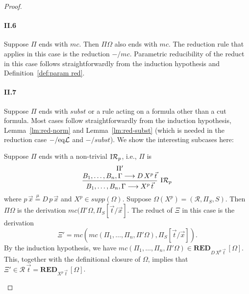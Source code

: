 \documentclass[preprint]{elsarticle}
\def\Rscr{{\mathcal R}}
\newcommand{\Seq}[2]{#1\longrightarrow #2}
\newcommand{\defmu}{\stackrel{\mu}{=}}
\newcommand{\eqL}{{\rm eq}{\cal L}}
\newcommand{\indRP}{{\rm I}{\cal R}_p}
\def\RED{{\mathbf{RED}}}
\begin{document}
\begin{proof}
\paragraph{\bf II.6} Suppose $\Pi$ ends with $mc$.  Then $\Pi\Omega$
also ends with $mc$. The reduction rule that applies in this case is
the reduction $-/mc$.  Parametric reducibility of the reduct in this
case follows straightforwardly from the induction hypothesis and
Definition~\ref{def:param red}.

\paragraph{\bf II.7} Suppose $\Pi$ ends with $subst$ or a rule acting on a
formula other than a cut formula.
Most cases follow straightforwardly from the induction hypothesis,
Lemma~\ref{lm:red-norm} and Lemma~\ref{lm:red-subst} (which is needed
in the reduction case $-/\eqL$ and $-/subst$).  We show the interesting subcases
here:

\begin{trivlist}

\item[\fbox{$-/\indRP$}] Suppose $\Pi$ ends with a non-trivial $\indRP$,
  i.e., $\Pi$ is
$$
\infer[\indRP] {\Seq{B_1,\ldots,B_n,\Gamma}{X^p\,\vec t}} {
  \deduce{\Seq{B_1,\ldots,B_n,\Gamma}{D\,X^p\,\vec t}}{\Pi'} }
$$
where $p\,\vec x \defmu D\,p\,\vec x$ and $X^p \in supp(\Omega)$.
Suppose $\Omega(X^p) = (\Rscr,\Pi_S,S)$. Then $\Pi\Omega$ is
the derivation $mc(\Pi'\Omega, \Pi_S[\vec t/\vec x]$.
The reduct of $\Xi$ in this case is the derivation
$$
\Xi' = mc(mc(\Pi_1,\ldots,\Pi_n,\Pi'\Omega), \Pi_S[\vec t/\vec x]).
$$
By the induction hypothesis, we have
$
mc(\Pi_1,\ldots, \Pi_n,\Pi'\Omega) \in \RED_{D\,X^p\,\vec t}\, [\Omega].
$
This, together with the definitional closure of $\Omega$, implies that
$\Xi' \in \Rscr\,\vec t = \RED_{X^p\,\vec t}\, [\Omega]$.


\end{trivlist}
\end{proof}
\end{document}
